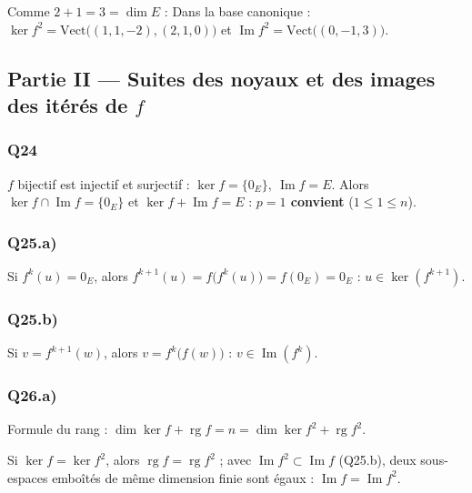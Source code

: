 \documentclass[11pt,a4paper]{article}
\newcommand{\equationajustee}[1]{%
  \sbox{\boiteequation}{$\displaystyle #1$}%
  \ifdim\wd\boiteequation>\linewidth
    \[\resizebox{\linewidth}{!}{\usebox{\boiteequation}}\]%
  \else
    \[#1\]%
  \fi}
\begin{document}
Comme \(2+1=3=\dim E\) :
\equationajustee{\boxed{E=\ker(f^2)\oplus\operatorname{Im}(f^2)}.}
Dans la base canonique : \(\ker f^2=\mathrm{Vect}\big((1,1,-2),(2,1,0)\big)\) et \(\operatorname{Im}f^2=\mathrm{Vect}\big((0,-1,3)\big)\).

\hypertarget{partie-ii-suites-des-noyaux-et-des-images-des-ituxe9ruxe9s-de-f}{%
\subsection{\texorpdfstring{Partie II --- Suites des noyaux et des images des itérés de \(f\)}{Partie II --- Suites des noyaux et des images des itérés de f}}\label{partie-ii-suites-des-noyaux-et-des-images-des-ituxe9ruxe9s-de-f}}

\hypertarget{q24}{%
\subsubsection{Q24}\label{q24}}

\(f\) bijectif est injectif et surjectif : \(\boxed{\ker f=\{0_E\},\ \operatorname{Im}f=E}\). Alors \(\ker f\cap\operatorname{Im}f=\{0_E\}\) et \(\ker f+\operatorname{Im}f=E\) : \textbf{\(p=1\) convient} (\(1\le1\le n\)).

\hypertarget{q25.a}{%
\subsubsection{Q25.a)}\label{q25.a}}

Si \(f^k(u)=0_E\), alors \(f^{k+1}(u)=f\big(f^k(u)\big)=f(0_E)=0_E\) : \(\boxed{u\in\ker(f^{k+1})}\).

\hypertarget{q25.b}{%
\subsubsection{Q25.b)}\label{q25.b}}

Si \(v=f^{k+1}(w)\), alors \(v=f^k\big(f(w)\big)\) : \(\boxed{v\in\operatorname{Im}(f^k)}\).

\hypertarget{q26.a}{%
\subsubsection{Q26.a)}\label{q26.a}}

Formule du rang : \(\dim\ker f+\operatorname{rg}f=n=\dim\ker f^2+\operatorname{rg}f^2\).

Si \(\ker f=\ker f^2\), alors \(\operatorname{rg}f=\operatorname{rg}f^2\) ; avec \(\operatorname{Im}f^2\subset\operatorname{Im}f\) (Q25.b), deux sous-espaces emboîtés de même dimension finie sont égaux : \(\operatorname{Im}f=\operatorname{Im}f^2\).
\end{document}
